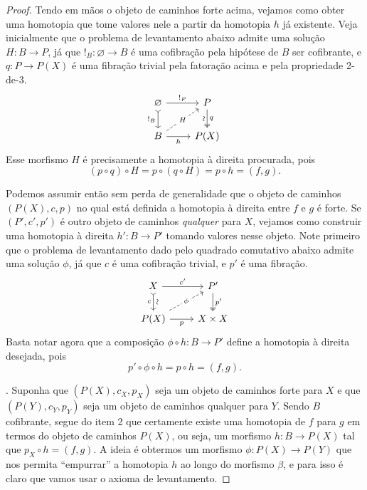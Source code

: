 \begin{proof}
  Tendo em mãos o objeto de caminhos forte acima, vejamos como obter uma homotopia que tome valores nele a partir da homotopia $h$ já existente.
  Veja inicialmente que o problema de levantamento abaixo admite uma solução $H: B \to P$, já que $!_{B}: \varnothing \to B$ é uma cofibração pela hipótese de $B$ ser cofibrante, e $q: P \to P(X)$ é uma fibração trivial pela fatoração acima e pela propriedade 2-de-3.
  \begin{displaymath}
    \begin{tikzcd}
      \varnothing
      \arrow[d, tail, "!_{B}" swap]
      \arrow[r, "!_{P}"]
      & P
      \arrow[d, two heads, "q", "\sim" {sloped, swap}]
      \\ B
      \arrow[r, "h" swap]
      \arrow[ru, dashed, "H" description]
      & P(X)
    \end{tikzcd}
  \end{displaymath}
  Esse morfismo $H$ é precisamente a homotopia à direita procurada, pois
  \begin{displaymath}
    (p \circ q) \circ H = p \circ (q \circ H) = p \circ h = (f,g).
  \end{displaymath}

  Podemos assumir então sem perda de generalidade que o objeto de caminhos $(P(X),c,p)$ no qual está definida a homotopia à direita entre $f$ e $g$ é forte.
  Se $(P',c',p')$ é outro objeto de caminhos \emph{qualquer} para $X$, vejamos como construir uma homotopia à direita $h': B \to P'$ tomando valores nesse objeto.
  Note primeiro que o problema de levantamento dado pelo quadrado comutativo abaixo admite uma solução $\phi$, já que $c$ é uma cofibração trivial, e $p'$ é uma fibração.
  \begin{displaymath}
    \begin{tikzcd}
      X
      \arrow[r, "c'"]
      \arrow[d, tail, "c" {swap}, "\sim" {sloped}]
      & P'
      \arrow[d, two heads, "p'"]
      \\ P(X)
      \arrow[ru, dashed, "\phi" description]
      \arrow[r, "p" swap]
      & X \times X
    \end{tikzcd}
  \end{displaymath}
  Basta notar agora que a composição $\phi \circ h: B \to P'$ define a homotopia à direita desejada, pois
  \begin{displaymath}
    p' \circ \phi \circ h = p \circ h = (f,g).
  \end{displaymath}

  . Suponha que $(P(X),c_{X},p_{X})$ seja um objeto de caminhos forte para $X$ e que $(P(Y),c_{Y},p_{Y})$ seja um objeto de caminhos qualquer para $Y$.
  Sendo $B$ cofibrante, segue do item 2 que certamente existe uma homotopia de $f$ para $g$ em termos do objeto de caminhos $P(X)$, ou seja, um morfismo $h: B \to P(X)$ tal que $p_{X} \circ h = (f,g)$.
  A ideia é obtermos um morfismo $\phi: P(X) \to P(Y)$ que nos permita ``empurrar'' a homotopia $h$ ao longo do morfismo $\beta$, e para isso é claro que vamos usar o axioma de levantamento.


\end{proof}
